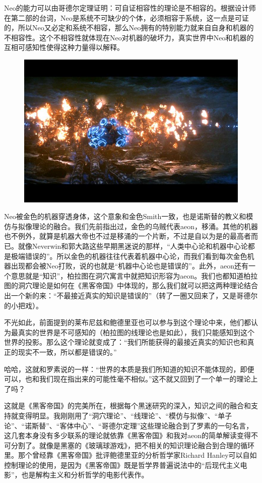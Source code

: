 \documentclass[UTF8]{ctexart}
\begin{document}
Neo的能力可以由哥德尔定理证明：可自证相容性的理论是不相容的。根据设计师在第二部的台词，Neo是系统不可缺少的个体，必须相容于系统，这一点是可证的，所以Neo又必定和系统不相容，那么Neo拥有的特别能力就来自自身和机器的不相容性。这个不相容性就体现在Neo对机器的破坏力，真实世界中Neo和机器的互相可感知性使得这种力量得以解释。

\begin{figure}[htb]
\centering
\includegraphics[width=0.5\linewidth]{fig/c45f2797cc612f6c55fb9697.jpg}
\end{figure}

Neo被金色的机器穿透身体，这个意象和金色Smith一致，也是诺斯替的教义和模仿与拟像理论的融合。我们先前指出过，金色的乌贼代表aeon，移涌。其他的机器也不例外，就算是机器大帝也不过是移涌的一个片断，不过是自以为是的最高者而已。就像Neverwin和郭大路这些早期黑迷说的那样，“人类中心论和机器中心论都是极端错误的”。所以金色的机器往往代表着机器中心论，而我们看到每次金色机器出现都会被Neo打败，说的也就是“机器中心论也是错误的”。此外，aeon还有一个意思就是“知识”，柏拉图在洞穴寓言中就把知识形容为aeon。我们也都知道柏拉图的洞穴理论是如何在《黑客帝国》中体现的，那么我们就可以把这两种理论结合出一个新的来：“不最接近真实的知识是错误的”（转了一圈又回来了，又是哥德尔的小把戏）。

不光如此，前面提到的莱布尼兹和鲍德里亚也可以参与到这个理论中来，他们都认为最真实的世界是不可感知的（柏拉图的线理论也是如此），我们只能感知到这个世界的投影。那么这个理论就变成了：“我们所能获得的最接近真实的知识也和真正的现实不一致，所以都是错误的。”

哈哈，这就和罗素说的一样：“世界的本质是我们所知道的知识不能体现的，即便可以，也和我们现在指出来的可能性毫不相似。”这不就又回到了一个单一的理论上了吗？

这就是《黑客帝国》的完美所在，根据每个黑迷研究的深入，知识之间的融合和支持就变得明显。我刚刚用了“洞穴理论”、“线理论”、“模仿与拟像”、“单子论”、“诺斯替”、“客体中心”、“哥德尔定理”这些理论融合到了罗素的一句名言，这几套本身没有多少联系的理论就依靠《黑客帝国》和我对aeon的简单解读变得不可分割了。就像是黑塞的《玻璃球游戏》，把不相关的知识理论融合到合理的循环里。那个曾经靠《黑客帝国》批评鲍德里亚的分析哲学家Richard Hanley可以自如控制理论的使用，是因为《黑客帝国》既是哲学界普遍说法中的“后现代主义电影”，也是解构主义和分析哲学的电影代表作。
\end{document}
